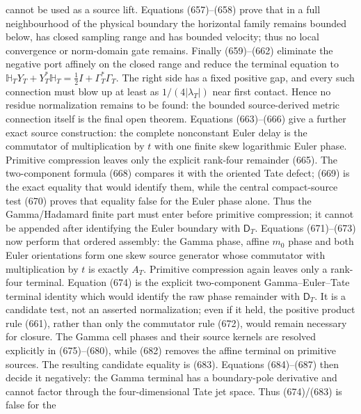 \documentclass[11pt]{article}
\begin{document}
\begin{itemize}
      cannot be used as a source lift.  Equations (657)--(658) prove that in
      a full neighbourhood of the physical boundary the horizontal family
      remains bounded below, has closed sampling range and has bounded
      velocity; thus no local convergence or norm-domain gate remains.
      Finally (659)--(662) eliminate the
      negative port affinely on the closed range and reduce the terminal
      equation to
      \(\mathbb H_TY_T+Y_T^*\mathbb H_T=
      \frac12I+\Gamma_T^*\Gamma_T\).
      The right side has a fixed positive gap, and every such connection must
      blow up at least as \(1/(4|\lambda_T|)\) near first contact.  Hence no
      residue normalization remains to be found: the bounded source-derived
      metric connection itself is the final open theorem.  Equations
      (663)--(666) give a further exact source construction: the complete
      nonconstant Euler delay is the commutator of multiplication by \(t\)
      with one finite skew logarithmic Euler phase.  Primitive compression
      leaves only the explicit rank-four remainder (665).  The
      two-component formula (668) compares it with the oriented Tate defect;
      (669) is the exact equality that would identify them, while the central
      compact-source test (670) proves that equality false for the Euler
      phase alone.  Thus the Gamma/Hadamard finite part must enter before
      primitive compression; it cannot be appended after identifying the
      Euler boundary with \(\mathsf D_T\).  Equations (671)--(673) now
      perform that ordered assembly: the Gamma phase, affine \(m_0\) phase
      and both Euler orientations form one skew source generator whose
      commutator with multiplication by \(t\) is exactly \(A_T\).
      Primitive compression again leaves only a rank-four terminal.
      Equation (674) is the explicit two-component Gamma--Euler--Tate
      terminal identity which would identify the raw phase remainder with
      \(\mathsf D_T\).  It is a candidate test, not an asserted
      normalization; even if it held, the positive product rule (661),
      rather than only the commutator rule (672), would remain necessary for
      closure.  The Gamma cell
      phases and their source kernels are resolved explicitly in
      (675)--(680), while (682) removes the affine terminal on primitive
      sources.  The resulting candidate equality is (683).  Equations
      (684)--(687) then decide it negatively: the Gamma terminal has a
      boundary-pole derivative and cannot factor through the
      four-dimensional Tate jet space.  Thus (674)/(683) is false for the

\end{itemize}
\end{document}
